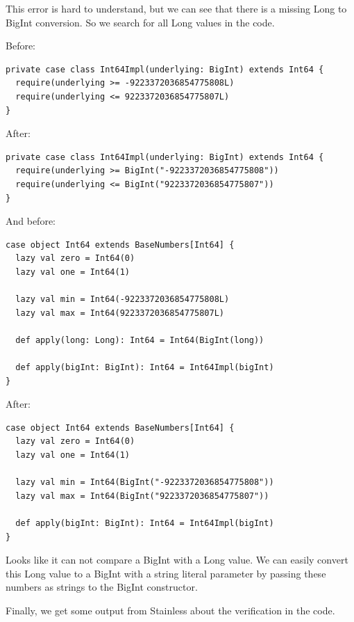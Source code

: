 \documentclass[runningheads]{llncs}
\begin{document}
This error is hard to understand, but we can see that there is a missing Long to BigInt conversion.
So we search for all Long values in the code.

Before:
\begin{lstlisting}[style=scala]
private case class Int64Impl(underlying: BigInt) extends Int64 {
  require(underlying >= -9223372036854775808L)
  require(underlying <= 9223372036854775807L)
}
\end{lstlisting}

After:
\begin{lstlisting}[style=scala]
private case class Int64Impl(underlying: BigInt) extends Int64 {
  require(underlying >= BigInt("-9223372036854775808"))
  require(underlying <= BigInt("9223372036854775807"))
}  
\end{lstlisting}

And before:
\begin{lstlisting}[style=scala]
case object Int64 extends BaseNumbers[Int64] {
  lazy val zero = Int64(0)
  lazy val one = Int64(1)

  lazy val min = Int64(-9223372036854775808L)
  lazy val max = Int64(9223372036854775807L)

  def apply(long: Long): Int64 = Int64(BigInt(long))

  def apply(bigInt: BigInt): Int64 = Int64Impl(bigInt)
}
\end{lstlisting}

After:
\begin{lstlisting}[style=scala]
case object Int64 extends BaseNumbers[Int64] {
  lazy val zero = Int64(0)
  lazy val one = Int64(1)

  lazy val min = Int64(BigInt("-9223372036854775808"))
  lazy val max = Int64(BigInt("9223372036854775807"))

  def apply(bigInt: BigInt): Int64 = Int64Impl(bigInt)
}
\end{lstlisting}

Looks like it can not compare a BigInt with a Long value.
We can easily convert this Long value to a BigInt with a string literal parameter by passing these numbers as strings to the BigInt constructor.

Finally, we get some output from Stainless about the verification in the code.
\end{document}
